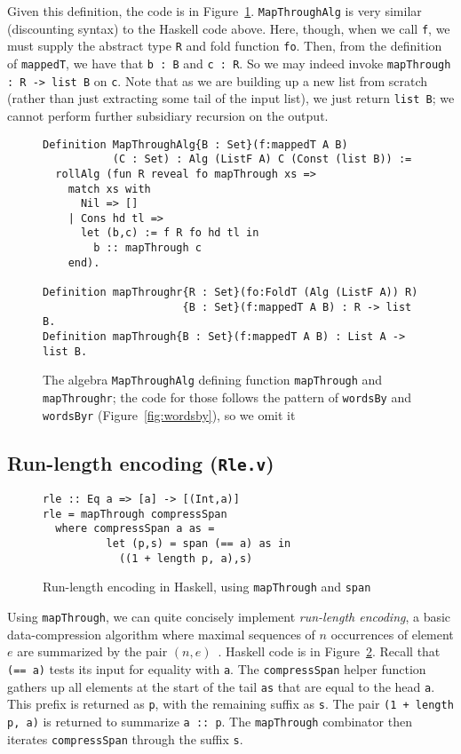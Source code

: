 \documentclass[a4paper,USenglish]{lipics-v2021}
\begin{document}
Given this definition, the code is in Figure~\ref{fig:mapthrough}.  
\verb|MapThroughAlg| is very similar (discounting syntax) to the
Haskell code above.  Here, though, when we call \verb|f|, we must
supply the abstract type \verb|R| and fold function \verb|fo|.  Then,
from the definition of \verb|mappedT|, we have that \verb|b : B| and
\verb|c : R|.  So we may indeed invoke \verb|mapThrough : R -> list B|
on \verb|c|.  Note that as we are building up a new list from scratch
(rather than just extracting some tail of the input list), we just
return \verb|list B|; we cannot perform further subsidiary recursion
on the output.  

\begin{figure}
\begin{verbatim}
Definition MapThroughAlg{B : Set}(f:mappedT A B)
           (C : Set) : Alg (ListF A) C (Const (list B)) :=
  rollAlg (fun R reveal fo mapThrough xs => 
    match xs with
      Nil => []
    | Cons hd tl =>
      let (b,c) := f R fo hd tl in
        b :: mapThrough c
    end).

Definition mapThroughr{R : Set}(fo:FoldT (Alg (ListF A)) R)
                      {B : Set}(f:mappedT A B) : R -> list B.
Definition mapThrough{B : Set}(f:mappedT A B) : List A -> list B.
\end{verbatim}
\caption{The algebra \texttt{MapThroughAlg} defining function \texttt{mapThrough} and \texttt{mapThroughr}; the
  code for those follows the pattern of \texttt{wordsBy} and \texttt{wordsByr} (Figure~\ref{fig:wordsby}), so
  we omit it}
\label{fig:mapthrough}
\end{figure}

\subsection{Run-length encoding (\texttt{Rle.v})}

\begin{figure}
\begin{verbatim}
rle :: Eq a => [a] -> [(Int,a)]
rle = mapThrough compressSpan
  where compressSpan a as =
          let (p,s) = span (== a) as in
            ((1 + length p, a),s)
\end{verbatim} 
\caption{Run-length encoding in Haskell, using \texttt{mapThrough} and \texttt{span}}
\label{fig:rlehs}
\end{figure}

Using \verb|mapThrough|, we can quite concisely implement
\emph{run-length encoding}, a basic data-compression algorithm where
maximal sequences of $n$ occurrences of element $e$ are summarized by
the pair $(n,e)$~\cite{datacomp}.  Haskell code is in Figure~\ref{fig:rlehs}.
Recall that \verb|(== a)| 
tests its input for equality with \verb|a|.  The
\verb|compressSpan| helper function gathers up all elements at the
start of the tail \verb|as| that are equal to the head \verb|a|.  This
prefix is returned as \verb|p|, with the remaining suffix as \verb|s|.
The pair \verb|(1 + length p, a)| is returned to summarize
\verb|a :: p|.  The \verb|mapThrough| combinator then iterates
\verb|compressSpan| through the suffix \verb|s|.
\end{document}
